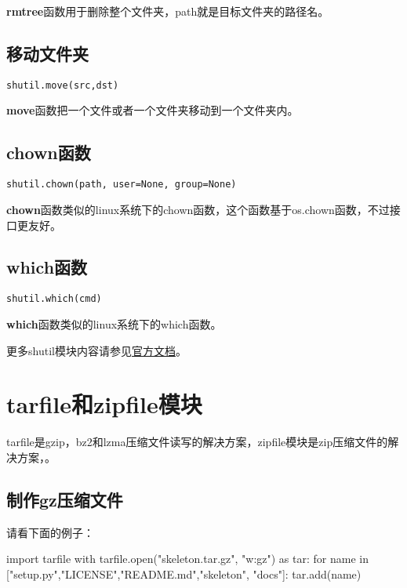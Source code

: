 \documentclass[12pt,oneside]{book}
\begin{document}
\begin{common-format}
\textbf{rmtree}函数用于删除整个文件夹，path就是目标文件夹的路径名。

\section{移动文件夹}
\begin{Verbatim}
shutil.move(src,dst)
\end{Verbatim}
\textbf{move}函数把一个文件或者一个文件夹移动到一个文件夹内。



\section{chown函数}
\begin{Verbatim}
shutil.chown(path, user=None, group=None)
\end{Verbatim}

\textbf{chown}函数类似的linux系统下的chown函数，这个函数基于os.chown函数，不过接口更友好。


\section{which函数}
\begin{Verbatim}
shutil.which(cmd)
\end{Verbatim}

\textbf{which}函数类似的linux系统下的which函数。



\begin{large}
更多shutil模块内容请参见\href{https://docs.python.org/3.4/library/shutil.html}{官方文档}。
\end{large}


\chapter{tarfile和zipfile模块}
tarfile是gzip，bz2和lzma压缩文件读写的解决方案，zipfile模块是zip压缩文件的解决方案，。

\section{制作gz压缩文件}
请看下面的例子：
\begin{tcbpython}[]
import tarfile
with tarfile.open("skeleton.tar.gz", "w:gz") as tar:
    for name in ["setup.py","LICENSE","README.md","skeleton", "docs"]:
        tar.add(name)
\end{tcbpython}


\end{common-format}
\end{document}
